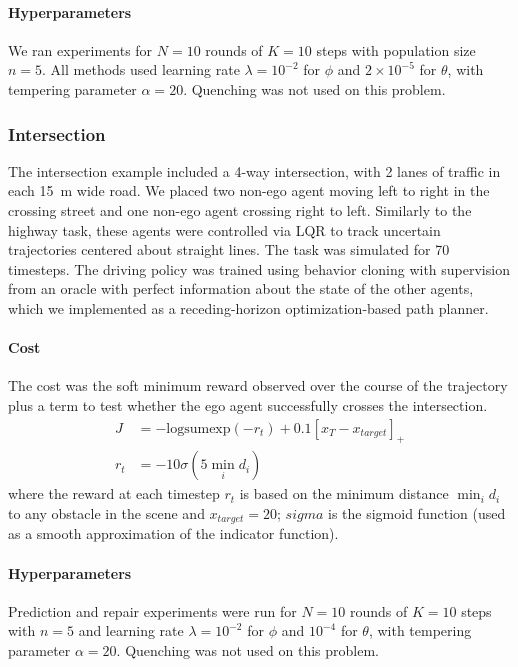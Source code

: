 \paragraph{Hyperparameters} We ran experiments for $N=10$ rounds of $K=10$ steps with population size $n=5$. All methods used learning rate $\lambda = 10^{-2}$ for $\phi$ and $2\times10^{-5}$ for $\theta$, with tempering parameter $\alpha = 20$. Quenching was not used on this problem.

\subsubsection{Intersection}

The intersection example included a 4-way intersection, with 2 lanes of traffic in each \SI{15}{m} wide road. We placed two non-ego agent moving left to right in the crossing street and one non-ego agent crossing right to left. Similarly to the highway task, these agents were controlled via LQR to track uncertain trajectories centered about straight lines. The task was simulated for 70 timesteps. The driving policy was trained using behavior cloning with supervision from an oracle with perfect information about the state of the other agents, which we implemented as a receding-horizon optimization-based path planner.

\paragraph{Cost} The cost was the soft minimum reward observed over the course of the trajectory plus a term to test whether the ego agent successfully crosses the intersection.
\begin{align}
    J   & = -\text{logsumexp}(-r_t) + 0.1 [x_T - x_{target}]_+ \\
    r_t & = -10 \sigma(5 \min_i d_i)
\end{align}
where the reward at each timestep $r_t$ is based on the minimum distance $\min_i d_i$ to any obstacle in the scene and $x_{target} = 20$; $sigma$ is the sigmoid function (used as a smooth approximation of the indicator function).

\paragraph{Hyperparameters} Prediction and repair experiments were run for $N=10$ rounds of $K=10$ steps with $n=5$ and learning rate $\lambda = 10^{-2}$ for $\phi$ and $10^{-4}$ for $\theta$, with tempering parameter $\alpha = 20$. Quenching was not used on this problem.